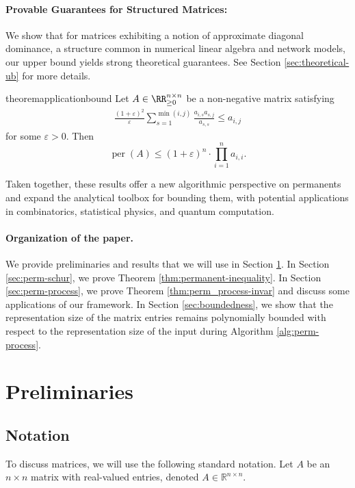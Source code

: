 \documentclass[11pt]{article}
\theoremstyle{definition}
\DeclareMathOperator{\per}{per}
\begin{document}
\paragraph{Provable Guarantees for Structured Matrices:} We show that for matrices exhibiting a notion of approximate diagonal dominance, a structure common in numerical linear algebra and network models, our upper bound yields strong theoretical guarantees. See Section \ref{sec:theoretical-ub} for more details.
\begin{restatable}{theorem}{applicationbound}\label{thm:application}
Let \( A \in \RR^{n \times n}_{\geq 0} \) be a non-negative matrix satisfying
\begin{align*}
	\frac{(1+\varepsilon)^2}{\varepsilon} \sum_{s=1}^{\min(i,j)} \frac{a_{i,s} a_{s,j}}{a_{s,s}} \le a_{i,j}
\end{align*}
for some \( \varepsilon > 0 \). Then
\begin{equation*}
    \per(A) \le (1+\varepsilon)^n \cdot \prod_{i=1}^n a_{i,i}.
\end{equation*}
\end{restatable}


Taken together, these results offer a new algorithmic perspective on permanents and expand the analytical toolbox for bounding them, with potential applications in combinatorics, statistical physics, and quantum computation.

\paragraph{Organization of the paper.} We provide preliminaries and results that we will use in Section \ref{sec:preliminaries}. In Section \ref{sec:perm-schur}, we prove Theorem \ref{thm:permanent-inequality}. In Section \ref{sec:perm-process}, we prove Theorem \ref{thm:perm_process-invar} and discuss some applications of our framework. In Section \ref{sec:boundedness}, we show that the representation size of the matrix entries remains polynomially bounded with respect to the representation size of the input during Algorithm \ref{alg:perm-process}.

\section{Preliminaries} \label{sec:preliminaries}
\subsection{Notation}
To discuss matrices, we will use the following standard notation. Let $A$ be an $n \times n$ matrix with real-valued entries, denoted $A \in \mathbb{R}^{n \times n}$.
\end{document}
